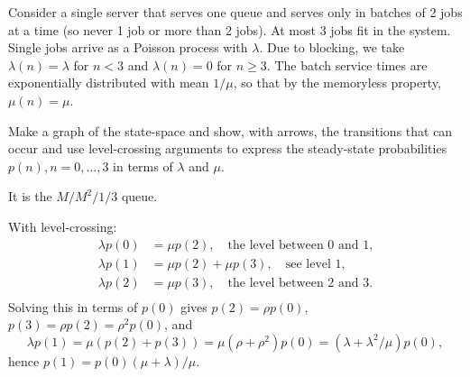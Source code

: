 \begin{exercise}\label{ex:67}
Consider
a single server that serves one queue and serves only in batches of 2 jobs at a time (so never 1 job or more than 2 jobs).  At most 3 jobs fit in the system.
 Single jobs arrive as a Poisson process with $\lambda$.
Due to blocking, we take $\lambda(n) = \lambda$ for $n<3$ and $\lambda(n)=0$ for $n\geq 3$.
The batch service times are exponentially distributed with mean $1/\mu$, so that  by the memoryless property, $\mu(n) = \mu$.

Make a graph of the state-space and show, with arrows, the transitions that can occur and  use level-crossing arguments to express the steady-state probabilities $p(n), n=0,\ldots, 3$ in terms of $\lambda$ and $\mu$.
\begin{solution}
It is the $M/M^2/1/3$ queue.


With level-crossing:
 \begin{align*}
 \lambda p(0) &= \mu p(2), \quad\text{the level between 0 and 1,}\\
 \lambda p(1) &= \mu p(2) +\mu p(3), \quad\text{see level 1,}\\
 \lambda p(2) &= \mu p(3), \quad\text{the level between 2 and 3.}\\
 \end{align*}
 Solving this in terms of $p(0)$ gives $p(2) = \rho p(0)$, $p(3) = \rho p(2) = \rho^2p(0)$, and
 \begin{equation*}
 \lambda p(1) = \mu(p(2) + p(3)) = \mu (\rho + \rho^2) p(0) = (\lambda + \lambda^2/\mu) p(0),
 \end{equation*}
hence $p(1) = p(0)(\mu + \lambda)/\mu$.
\end{solution}
\end{exercise}

